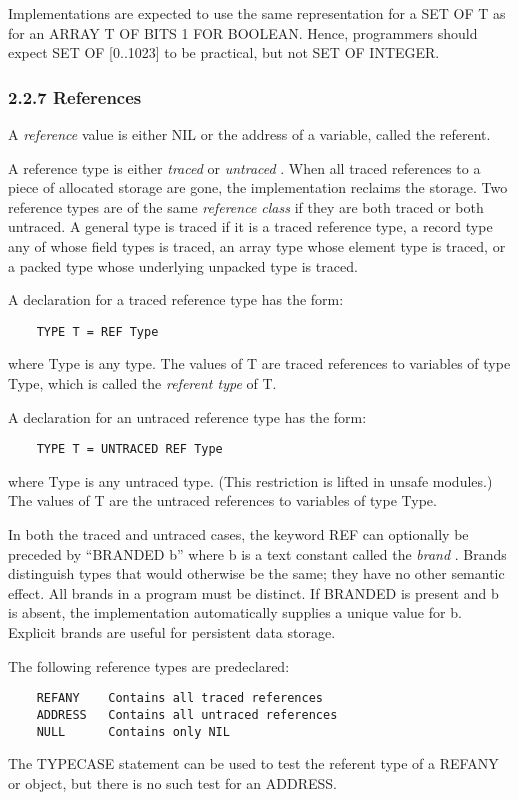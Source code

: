 \documentclass[10pt]{article}
\begin{document}
  Implementations are expected to use the same representation for a SET OF T as for an ARRAY T OF BITS 1 FOR BOOLEAN. Hence, programmers should expect SET OF [0..1023] to be practical, but not SET OF INTEGER. 


 
\subsubsection*{2.2.7 References}


  A \emph{reference}
 value is either NIL or the address of a variable, called the referent. 


 A reference type is either \emph{traced}
 or \emph{untraced}
. When all traced references to a piece of allocated storage are gone, the implementation reclaims the storage. Two reference types are of the same \emph{reference class}
 if they are both traced or both untraced. A general type is traced if it is a traced reference type, a record type any of whose field types is traced, an array type whose element type is traced, or a packed type whose underlying unpacked type is traced. 


 A declaration for a traced reference type has the form: 
\begin{verbatim}
    TYPE T = REF Type
\end{verbatim}
 where Type is any type. The values of T are traced references to variables of type Type, which is called the \emph{referent type}
 of T. 


 A declaration for an untraced reference type has the form: 
\begin{verbatim}
    TYPE T = UNTRACED REF Type
\end{verbatim}
 where Type is any untraced type. (This restriction is lifted in unsafe modules.) The values of T are the untraced references to variables of type Type. 


 In both the traced and untraced cases, the keyword REF can optionally be preceded by ``BRANDED b'' where b is a text constant called the \emph{brand}
. Brands distinguish types that would otherwise be the same; they have no other semantic effect. All brands in a program must be distinct. If BRANDED is present and b is absent, the implementation automatically supplies a unique value for b. Explicit brands are useful for persistent data storage. 


 The following reference types are predeclared: 
\begin{verbatim}
    REFANY    Contains all traced references
    ADDRESS   Contains all untraced references
    NULL      Contains only NIL
\end{verbatim}
 The TYPECASE statement can be used to test the referent type of a REFANY or object, but there is no such test for an ADDRESS. 
\end{document}
